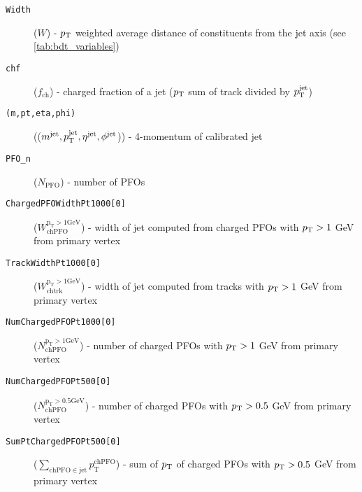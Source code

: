\begin{description}
    \item[\texttt{Width}]  ($W$) -  $p_\text{T}$ weighted average distance of constituents from the jet axis (see \cref{tab:bdt_variables})
    \item[\texttt{chf}]  ($f_{\text{ch}}$) -  charged fraction of a jet ($p_\text{T}$ sum of track divided by $p_\text{T}^{\text{jet}}$)
    \item[\texttt{(m,pt,eta,phi)}]  (($m^{\text{jet}},p_\text{T}^{\text{jet}}, \eta^{\text{jet}}, \phi^{\text{jet}}$)) -  4-momentum of calibrated jet
    \item[\texttt{PFO\_n}]  ($N_{\text{PFO}}$) -  number of PFOs
    \item[\texttt{ChargedPFOWidthPt1000[0]}] ($W_{\mathrm{chPFO}}^{\mathrm{p_{\mathrm{T}} > 1 \mathrm{GeV}}}$)  - width of jet computed from charged PFOs with $p_\text{T} > 1$ GeV from primary vertex
    \item[\texttt{TrackWidthPt1000[0]}] ($W_{\mathrm{chtrk}}^{\mathrm{p_{\mathrm{T}} > 1 \mathrm{GeV}}}$)  -  width of jet computed from tracks with $p_\text{T} > 1$ GeV from primary vertex
    \item[\texttt{NumChargedPFOPt1000[0]}] ($N_{\mathrm{chPFO}}^{\mathrm{p_{\mathrm{T}} > 1 \mathrm{GeV}}}$)  -  number of charged PFOs with $p_\text{T} > 1$ GeV from primary vertex
    \item[\texttt{NumChargedPFOPt500[0]}] ($N_{\mathrm{ch PFO}}^{\mathrm{p_{\mathrm{T}} > 0.5 \mathrm{GeV}}}$) -  number of charged PFOs with $p_\text{T} > 0.5$ GeV from primary vertex
    \item[\texttt{SumPtChargedPFOPt500[0]}] ($\sum_{\mathrm{ch PFO} \in \mathrm{jet}} p_{\mathrm{T}}^{\mathrm{ch PFO}}$) -  sum of $p_\text{T}$ of charged PFOs with $p_\text{T} > 0.5$ GeV from primary vertex
\end{description}

